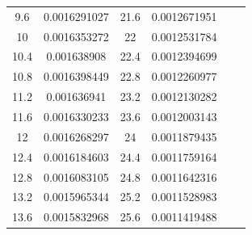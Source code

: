 \documentclass[
	12pt,				%
	openright,			%
	twoside,			%
	a4paper,			%
	english,			%
	french,				%
	spanish,			%
	brazil,				%
	]{abntex2}
\begin{document}
\begin{apendicesenv}
\begin{table}[H]
\begin{tabular}{c c| c c | c c}
9.6 & 0.0016291027 & 21.6 & 0.0012671951 \\
10 & 0.0016353272 & 22 & 0.0012531784 & \\
10.4 & 0.001638908 & 22.4 & 0.0012394699 \\
10.8 & 0.0016398449 & 22.8 & 0.0012260977 \\
11.2 & 0.001636941 & 23.2 & 0.0012130282 \\
11.6 & 0.0016330233 & 23.6 & 0.0012003143 \\
12 & 0.0016268297 & 24 & 0.0011879435 \\
12.4 & 0.0016184603 & 24.4 & 0.0011759164 \\
12.8 & 0.0016083105 & 24.8 & 0.0011642316 \\
13.2 & 0.0015965344 & 25.2 & 0.0011528983 \\
13.6 & 0.0015832968 & 25.6 & 0.0011419488 
\end{tabular}
\end{table}



\end{apendicesenv}
\end{document}
